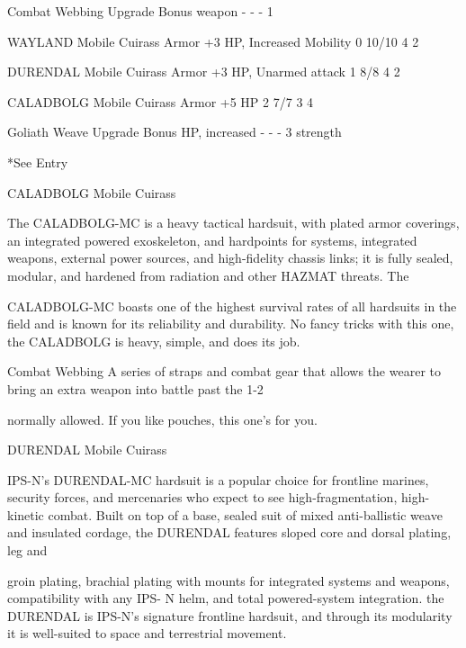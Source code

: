  Combat Webbing                        Upgrade       Bonus weapon                    -        -             -      1

  WAYLAND Mobile Cuirass               Armor         +3 HP, Increased Mobility      0         10/10         4      2

 DURENDAL Mobile Cuirass               Armor         +3 HP, Unarmed attack          1         8/8           4      2

 CALADBOLG Mobile Cuirass              Armor         +5 HP                          2         7/7           3      4

 Goliath Weave                         Upgrade       Bonus HP, increased            -         -             -      3
                                                    strength

*See Entry


CALADBOLG Mobile Cuirass

The CALADBOLG-MC is a heavy tactical hardsuit, with plated armor coverings, an integrated powered
exoskeleton, and hardpoints for systems, integrated weapons, external power sources, and high-fidelity
chassis links; it is fully sealed, modular, and hardened from radiation and other HAZMAT threats. The

CALADBOLG-MC boasts one of the highest survival rates of all hardsuits in the field and is known for its
reliability and durability. No fancy tricks with this one, the CALADBOLG is heavy, simple, and does its job.

Combat Webbing
A series of straps and combat gear that allows the wearer to bring an extra weapon into battle past the 1-2

normally allowed. If you like pouches, this one's for you.


DURENDAL Mobile Cuirass

IPS-N's DURENDAL-MC hardsuit is a popular choice for frontline marines, security forces, and mercenaries
who expect to see high-fragmentation, high-kinetic combat. Built on top of a base, sealed suit of mixed
anti-ballistic weave and insulated cordage, the DURENDAL features sloped core and dorsal plating, leg and




groin plating, brachial plating with mounts for integrated systems and weapons, compatibility with any IPS-
N helm, and total powered-system integration. the DURENDAL is IPS-N's signature frontline hardsuit, and
through its modularity it is well-suited to space and terrestrial movement.

